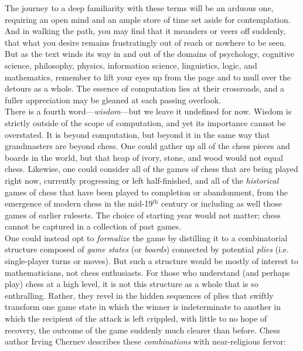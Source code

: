 The journey to a deep familiarity with these terms will be an arduous one, requiring an open mind and an ample store of time set aside for contemplation. And in walking the path, you may find that it meanders or veers off suddenly, that what you desire remains frustratingly out of reach or nowhere to be seen. But as the text winds its way in and out of the domains of psychology, cognitive science, philosophy, physics, information science, linguistics, logic, and mathematics, remember to lift your eyes up from the page and to mull over the detours as a whole. The essence of computation lies at their crossroads, and a fuller appreciation may be gleaned at each passing overlook. \\

There is a fourth word---\textit{wisdom}---but we leave it undefined for now. Wisdom is strictly outside of the scope of computation, and yet its importance cannot be overstated. It is beyond computation, but beyond it in the same way that grandmasters are beyond chess. One could gather up all of the chess pieces and boards in the world, but that heap of ivory, stone, and wood would not equal chess. Likewise, one could consider all of the games of chess that are being played right now, currently progressing or left half-finished, and all of the \textit{historical} games of chess that have been played to completion or abandonment, from the emergence of modern chess in the mid-19$^\textit{th}$ century or including as well those games of earlier rulesets. The choice of starting year would not matter; chess cannot be captured in a collection of past games. \\

One could instead opt to \textit{formalize} the game by distilling it to a combinatorial structure composed of \textit{game states} (or \textit{boards}) connected by potential \textit{plies} (i.e. single-player turns or moves). But such a structure would be mostly of interest to mathematicians, not chess enthusiasts. For those who understand (and perhaps play) chess at a high level, it is not this structure as a whole that is so enthralling. Rather, they revel in the hidden sequences of plies that swiftly transform one game state in which the winner is indeterminate to another in which the recipient of the attack is left crippled, with little to no hope of recovery, the outcome of the game suddenly much clearer than before. Chess author Irving Chernev describes these \textit{combinations} with near-religious fervor: \\

